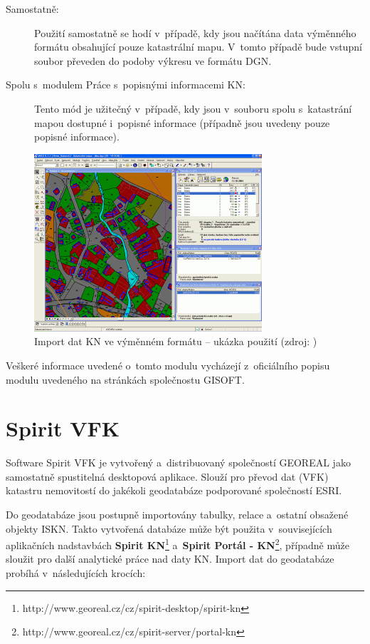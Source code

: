 \documentclass[a4paper,12pt,oneside]{book}
\begin{document}
\begin{description}
 \item[Samostatně:] Použití samostatně se hodí v~případě, kdy jsou načítána data výměnného formátu obsahující pouze katastrální mapu. V~tomto případě bude vstupní soubor převeden do podoby výkresu ve formátu DGN.

 \item[Spolu s~modulem Práce s~popisnými informacemi KN:] Tento mód je užiteč\-ný v~případě, kdy jsou v~souboru spolu s~katastrání mapou dostupné i~popisné informace (případně jsou uvedeny pouze popisné informace).	
\end{description}

\begin{figure}[htb]
\centering
\includegraphics[scale=1]{images/microstation_modul.png}
\caption[Import dat KN ve výměnném formátu -- ukázka použití]{Import dat KN ve výměnném formátu -- ukázka použití (zdroj: \cite{gisoft_modul})}
\end{figure}

Veškeré informace uvedené o~tomto modulu vycházejí z~oficiálního popisu modulu uvedeného na stránkách společnostu GISOFT. \cite{gisoft_modul}

\newpage
\section{Spirit VFK}
Software Spirit VFK je vytvořený a~distribuovaný společností GEOREAL jako samostatně spustitelná desktopová aplikace. Slouží pro převod dat (VFK) katastru nemovitostí do jakékoli geodatabáze podporované společností ESRI. 

Do geodatabáze jsou postupně importovány tabulky, relace a~ostatní obsažené objekty ISKN. Takto vytvořená databáze může být použita v~souvisejících aplikačních nadstavbách \textbf{Spirit KN}\footnote{http://www.georeal.cz/cz/spirit-desktop/spirit-kn} a~\textbf{Spirit Portál - KN}\footnote{http://www.georeal.cz/cz/spirit-server/portal-kn}, případně může sloužit pro další analytické práce nad daty KN. Import dat do geodatabáze probíhá v~následujících krocích:
\end{document}
